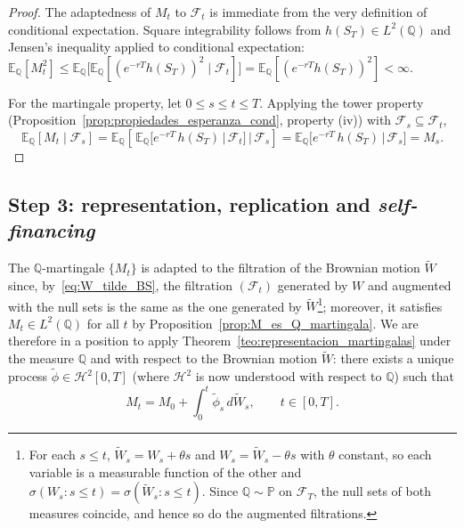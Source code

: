\documentclass[11pt,a4paper,oneside]{report}
\theoremstyle{plain}
\theoremstyle{definition}
\theoremstyle{remark}
\newcommand{\E}{\mathbb{E}}
\newcommand{\PP}{\mathbb{P}}
\newcommand{\Q}{\mathbb{Q}}
\newcommand{\F}{\mathcal{F}}
\newcommand{\1}{\mathbf{1}}
\begin{document}
\begin{proof}
The adaptedness of $M_t$ to $\F_t$ is immediate from the very
definition of conditional expectation. Square integrability follows
from $h(S_T) \in L^2(\Q)$ and Jensen's inequality applied to
conditional expectation:
$\E_\Q[M_t^2] \leq \E_\Q\bigl[\E_\Q[(e^{-rT} h(S_T))^2 \mid \F_t]\bigr] = \E_\Q[(e^{-rT} h(S_T))^2] < \infty$.

For the martingale property, let $0 \leq s \leq t \leq T$. Applying
the tower property
(Proposition~\ref{prop:propiedades_esperanza_cond}, property (iv))
with $\F_s \subseteq \F_t$,
\begin{equation*}
  \E_\Q[M_t \mid \F_s]
  = \E_\Q\!\left[\,\E_\Q\bigl[e^{-rT}\, h(S_T) \,\big|\, \F_t\bigr]
                 \,\Big|\, \F_s\right]
  = \E_\Q\!\bigl[e^{-rT}\, h(S_T) \,\big|\, \F_s\bigr]
  = M_s.
\end{equation*}
\end{proof}

\subsection{Step 3: representation, replication and \emph{self-financing}}
\label{subsec:paso3_replicacion}

The
$\Q$-martingale $\{M_t\}$ is adapted to the filtration of the
Brownian motion $\widetilde W$ since, by~\eqref{eq:W_tilde_BS}, the
filtration $(\F_t)$ generated by $W$ and augmented with the null sets
is the same as the one generated by $\widetilde W$\footnote{For each $s \le t$, $\widetilde W_s = W_s + \theta s$ and $W_s = \widetilde W_s - \theta s$ with $\theta$ constant, so each variable is a measurable function of the other and $\sigma(W_s : s \le t) = \sigma(\widetilde W_s : s \le t)$. Since $\Q \sim \PP$ on $\F_T$, the null sets of both measures coincide, and hence so do the augmented filtrations.}; moreover, it
satisfies $M_t \in L^2(\Q)$ for all $t$ by
Proposition~\ref{prop:M_es_Q_martingala}. We are therefore in a
position to apply Theorem~\ref{teo:representacion_martingalas} under
the measure $\Q$ and with respect to the Brownian motion
$\widetilde W$: there exists a unique process
$\widetilde\phi \in \mathcal{H}^2[0, T]$ (where $\mathcal{H}^2$ is
now understood with respect to $\Q$) such that
\begin{equation}\label{eq:representacion_M}
  M_t = M_0 + \int_0^t \widetilde\phi_s\, d\widetilde W_s,
  \qquad t \in [0, T].
\end{equation}
\end{document}
